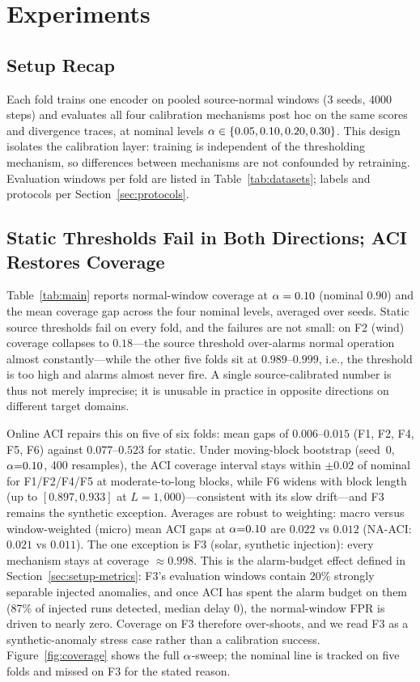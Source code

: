 \section{Experiments}
\label{sec:experiments}

\subsection{Setup Recap}
Each fold trains one encoder on pooled source-normal windows (3 seeds, 4000 steps) and evaluates all four calibration mechanisms post hoc on the same scores and divergence traces, at nominal levels $\alpha\in\{0.05,0.10,0.20,0.30\}$. This design isolates the calibration layer: training is independent of the thresholding mechanism, so differences between mechanisms are not confounded by retraining. Evaluation windows per fold are listed in Table~\ref{tab:datasets}; labels and protocols per Section~\ref{sec:protocols}.

\subsection{Static Thresholds Fail in Both Directions; ACI Restores Coverage}
Table~\ref{tab:main} reports normal-window coverage at $\alpha=0.10$ (nominal $0.90$) and the mean coverage gap across the four nominal levels, averaged over seeds. Static source thresholds fail on every fold, and the failures are not small: on F2 (wind) coverage collapses to $0.18$---the source threshold over-alarms normal operation almost constantly---while the other five folds sit at $0.989$--$0.999$, i.e., the threshold is too high and alarms almost never fire. A single source-calibrated number is thus not merely imprecise; it is unusable in practice in opposite directions on different target domains.

Online ACI repairs this on five of six folds: mean gaps of $0.006$--$0.015$ (F1, F2, F4, F5, F6) against $0.077$--$0.523$ for static. Under moving-block bootstrap (seed~0, $\alpha{=}0.10$, 400 resamples), the ACI coverage interval stays within $\pm0.02$ of nominal for F1/F2/F4/F5 at moderate-to-long blocks, while F6 widens with block length (up to $[0.897,0.933]$ at $L{=}1{,}000$)---consistent with its slow drift---and F3 remains the synthetic exception. Averages are robust to weighting: macro versus window-weighted (micro) mean ACI gaps at $\alpha{=}0.10$ are $0.022$ vs $0.012$ (NA-ACI: $0.021$ vs $0.011$). The one exception is F3 (solar, synthetic injection): every mechanism stays at coverage $\approx 0.998$. This is the alarm-budget effect defined in Section~\ref{sec:setup-metrics}: F3's evaluation windows contain 20\% strongly separable injected anomalies, and once ACI has spent the alarm budget on them (87\% of injected runs detected, median delay 0), the normal-window FPR is driven to nearly zero. Coverage on F3 therefore over-shoots, and we read F3 as a synthetic-anomaly stress case rather than a calibration success. Figure~\ref{fig:coverage} shows the full $\alpha$-sweep; the nominal line is tracked on five folds and missed on F3 for the stated reason.

